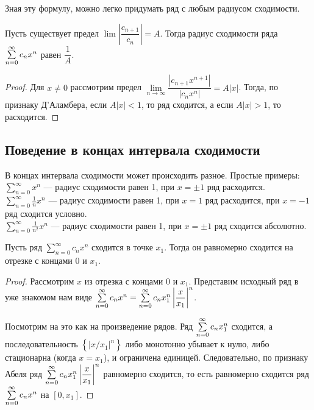 \documentclass[a4paper, 12pt]{article}
\begin{document}
Зная эту формулу, можно легко придумать ряд с любым радиусом сходимости.

\begin{Statement}
Пусть существует предел $\lim \left|\dfrac{c_{n+1}}{c_n}  \right| = A$. Тогда радиус сходимости ряда $\sum\limits_{n=0}^{\infty} c_nx^n$ равен $\dfrac{1}{A}$.
\end{Statement}

\begin{proof}
Для $x \neq 0$ рассмотрим предел $\lim\limits_{n \to \infty} \dfrac{|c_{n+1}x^{n+1}|}{|c_nx^n|} = A|x|$. Тогда, по признаку Д'Аламбера, если $A|x| < 1$, то ряд сходится, а если $A|x| > 1$, то расходится.
\end{proof}

\subsection{Поведение в концах интервала сходимости}

В концах интервала сходимости может происходить разное.
Простые примеры:
\\$\sum\limits_{n = 0}^{\infty}x^n$ --- радиус сходимости равен 1, при $x= \pm1$ ряд расходится.
\\$\sum\limits_{n = 0}^{\infty}\frac{1}{n} x^n$ --- радиус сходимости равен 1, при $x= 1$ ряд расходится, при $x = -1$ ряд сходится условно.
\\$\sum\limits_{n = 0}^{\infty}\frac{1}{n^2} x^n$ --- радиус сходимости равен 1, при $x= \pm 1$ ряд сходится абсолютно.



\begin{Theorem} [Абеля II]
	Пусть ряд $\sum\limits_{n = 0}^{\infty}c_n x^n$ сходится в точке $x_1$. Тогда он равномерно сходится на отрезке с концами $0$ и $x_1$.
\end{Theorem}

\begin{proof}
Рассмотрим $x$ из отрезка с концами 0 и $x_1$. Представим исходный ряд в уже знакомом нам виде $\sum\limits_{n=0}^{\infty} c_n x^n = \sum\limits_{n=0}^{\infty} c_n x_1^n \left|\dfrac{x}{x_1} \right|^n$.

Посмотрим на это как на произведение рядов. Ряд $\sum\limits_{n=0}^{\infty} c_nx_1^n$ сходится, а последовательность $\left\{\left|x/x_1\right|^n \right\}$ либо монотонно убывает к нулю, либо стационарна (когда $x=x_1$), и ограничена единицей. Следовательно, по признаку Абеля ряд $\sum\limits_{n=0}^{\infty} c_n x_1^n \left|\dfrac{x}{x_1} \right|^n$ равномерно сходится, то есть равномерно сходится ряд $\sum\limits_{n=0}^{\infty} c_nx^n$ на $[0, x_1]$.
\end{proof}
\end{document}

